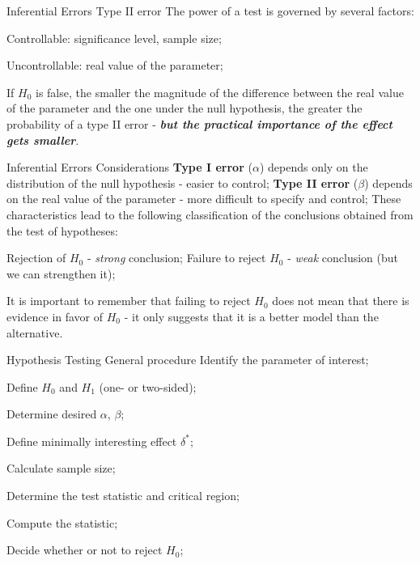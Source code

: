 \documentclass[t]{beamer}
\begin{document}

\begin{ftst}
{Inferential Errors}
{Type II error}
The power of a test is governed by several factors:

\bitems Controllable: significance level, sample size;
	\item Uncontrollable: real value of the parameter;
\eitem

If $H_0$ is false, the smaller the magnitude of the difference between the real value of the parameter and the one under the null hypothesis, the greater the probability of a type II error - \textbf{\textit{but the practical importance of the effect gets smaller}}.
\end{ftst}


\begin{ftst}
{Inferential Errors}
{Considerations}
\textbf{Type I error} ($\alpha$) depends only on the distribution of the null hypothesis - easier to control;
\vone
\textbf{Type II error} ($\beta$) depends on the real value of the parameter - more difficult to specify and control;
\vone
These characteristics lead to the following classification of the conclusions obtained from the test of hypotheses:
\begin{block}{}
\bitems Rejection of $H_0$ - \textit{strong} conclusion; 
\spitem Failure to reject $H_0$ - \textit{weak} conclusion (but we can strengthen it);
\eitem
\end{block}
\vone
It is important to remember that failing to reject $H_0$ does not mean that there is evidence in favor of $H_0$ - it only suggests that it is a better model than the alternative.
\end{ftst}


\begin{ftst}
{Hypothesis Testing}
{General procedure}
\bitems Identify the parameter of interest;
	\item Define $H_0$ and $H_1$ (one- or two-sided);
	\item Determine desired $\alpha$, $\beta$;
	\item Define minimally interesting effect $\delta^*$;
	\item Calculate sample size;
	\item Determine the test statistic and critical region;
	\item Compute the statistic;
	\item Decide whether or not to reject $H_0$;
\eitem

\end{ftst}
\end{document}
